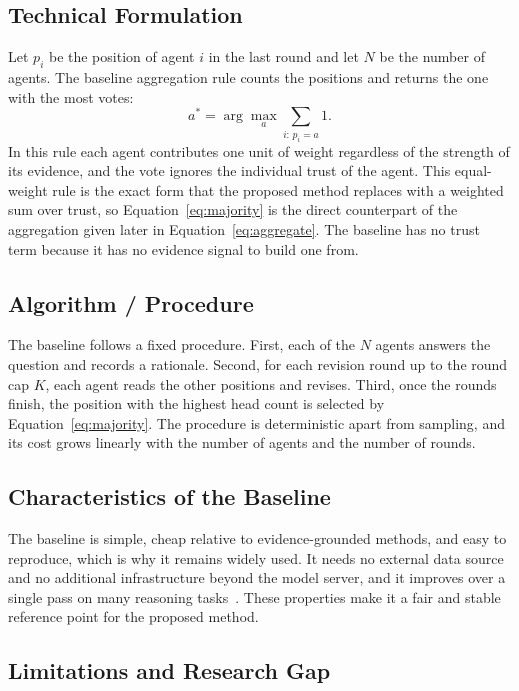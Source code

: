 \documentclass[a4paper,fleqn]{cas-sc}
\begin{document}
\subsection{Technical Formulation}

Let $p_i$ be the position of agent $i$ in the last round and let $N$ be the number of agents. The baseline aggregation rule counts the positions and returns the one with the most votes:
\begin{equation}\label{eq:majority}
  a^{*} = \arg\max_{a} \sum_{i:\, p_i = a} 1 .
\end{equation}
In this rule each agent contributes one unit of weight regardless of the strength of its evidence, and the vote ignores the individual trust of the agent. This equal-weight rule is the exact form that the proposed method replaces with a weighted sum over trust, so Equation~\eqref{eq:majority} is the direct counterpart of the aggregation given later in Equation~\eqref{eq:aggregate}. The baseline has no trust term because it has no evidence signal to build one from.

\subsection{Algorithm / Procedure}

The baseline follows a fixed procedure. First, each of the $N$ agents answers the question and records a rationale. Second, for each revision round up to the round cap $K$, each agent reads the other positions and revises. Third, once the rounds finish, the position with the highest head count is selected by Equation~\eqref{eq:majority}. The procedure is deterministic apart from sampling, and its cost grows linearly with the number of agents and the number of rounds.

\subsection{Characteristics of the Baseline}

The baseline is simple, cheap relative to evidence-grounded methods, and easy to reproduce, which is why it remains widely used. It needs no external data source and no additional infrastructure beyond the model server, and it improves over a single pass on many reasoning tasks~\cite{du2024improving}. These properties make it a fair and stable reference point for the proposed method.

\subsection{Limitations and Research Gap}
\end{document}
